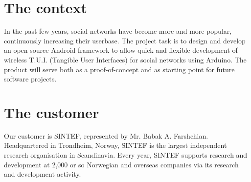 \section{The context}
In the past few years, social networks have become more and more popular, continuously increasing their userbase.
The project task is to design and develop an open source Android framework to allow quick and flexible
development of wireless T.U.I. (Tangible User Interfaces) for social networks using Arduino.
The product will serve both as a proof-of-concept and as starting point for future software projects.

\section{The customer}
Our customer is SINTEF, represented by Mr. Babak A. Farshchian.
Headquartered in Trondheim, Norway, SINTEF is the largest independent research organisation in Scandinavia.
Every year, SINTEF supports research and development at 2,000 or so Norwegian and overseas
companies via its research and development activity.